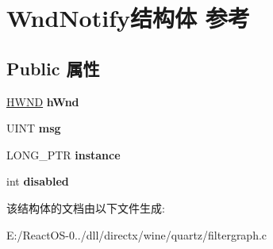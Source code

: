 \hypertarget{struct_wnd_notify}{}\section{Wnd\+Notify结构体 参考}
\label{struct_wnd_notify}
\subsection*{Public 属性}
\begin{DoxyCompactItemize}
\item 
\mbox{\label{struct_wnd_notify_af64781e0218fd91af26bf37dab511863}} 
\hyperlink{interfacevoid}{H\+W\+ND} {\bfseries h\+Wnd}
\item 
\mbox{\label{struct_wnd_notify_a92bd05acda845166e496d6ec3c37c54b}} 
U\+I\+NT {\bfseries msg}
\item 
\mbox{\label{struct_wnd_notify_a4d56cb03eafc9ddbe8dbbf7aeaaef300}} 
L\+O\+N\+G\+\_\+\+P\+TR {\bfseries instance}
\item 
\mbox{\label{struct_wnd_notify_a60d7afac7d6f224ea7395d3c333c22b0}} 
int {\bfseries disabled}
\end{DoxyCompactItemize}


该结构体的文档由以下文件生成\+:\begin{DoxyCompactItemize}
\item 
E\+:/\+React\+O\+S-\/0../dll/directx/wine/quartz/filtergraph.\+c\end{DoxyCompactItemize}
